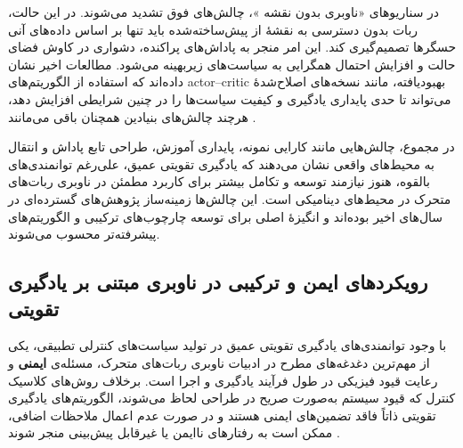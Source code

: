 در سناریوهای «ناوبری بدون نقشه%
»، چالش‌های فوق تشدید می‌شوند. در این حالت، ربات بدون دسترسی به نقشهٔ از پیش‌ساخته‌شده باید تنها بر اساس داده‌های آنی حسگرها تصمیم‌گیری کند. این امر منجر به پاداش‌های پراکنده، دشواری در کاوش فضای حالت و افزایش احتمال همگرایی به سیاست‌های زیر‌بهینه می‌شود. مطالعات اخیر نشان داده‌اند که استفاده از الگوریتم‌های actor–critic بهبود‌یافته، مانند نسخه‌های اصلاح‌شدهٔ  می‌تواند تا حدی پایداری یادگیری و کیفیت سیاست‌ها را در چنین شرایطی افزایش دهد، هرچند چالش‌های بنیادین همچنان باقی می‌مانند%
\cite{Nasti2025MaplessTD3}.

در مجموع، چالش‌هایی مانند کارایی نمونه، پایداری آموزش، طراحی تابع پاداش و انتقال به محیط‌های واقعی نشان می‌دهند که یادگیری تقویتی عمیق، علی‌رغم توانمندی‌های بالقوه، هنوز نیازمند توسعه و تکامل بیشتر برای کاربرد مطمئن در ناوبری ربات‌های متحرک در محیط‌های دینامیکی است. این چالش‌ها زمینه‌ساز پژوهش‌های گسترده‌ای در سال‌های اخیر بوده‌اند و انگیزهٔ اصلی برای توسعه چارچوب‌های ترکیبی و الگوریتم‌های پیشرفته‌تر محسوب می‌شوند.
\subsection{رویکردهای ایمن و ترکیبی در ناوبری مبتنی بر یادگیری تقویتی}

با وجود توانمندی‌های یادگیری تقویتی عمیق در تولید سیاست‌های کنترلی تطبیقی، یکی از مهم‌ترین دغدغه‌های مطرح در ادبیات ناوبری ربات‌های متحرک، مسئله‌ی \textbf{ایمنی} و رعایت قیود فیزیکی در طول فرآیند یادگیری و اجرا است. برخلاف روش‌های کلاسیک کنترل که قیود سیستم به‌صورت صریح در طراحی لحاظ می‌شوند، الگوریتم‌های یادگیری تقویتی ذاتاً فاقد تضمین‌های ایمنی هستند و در صورت عدم اعمال ملاحظات اضافی، ممکن است به رفتارهای ناایمن یا غیرقابل پیش‌بینی منجر شوند%
\cite{Le2024DRLNavigationSurvey}.

